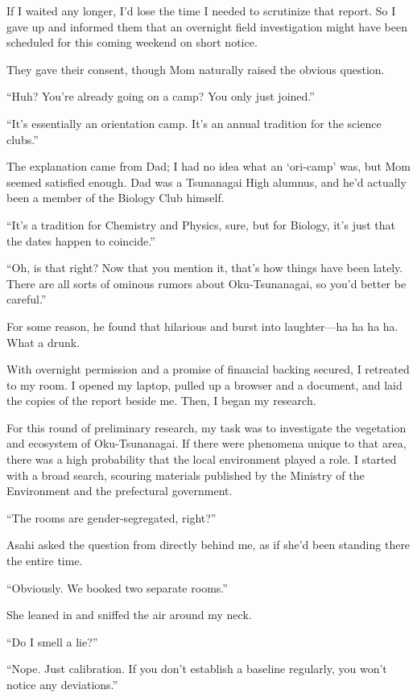 \documentclass[
    a4paper,
    12pt,
    twoside,
    openany,
    UTF8,
    fontset=windows
]{ctexbook}
\begin{document}
If I waited any longer, I'd lose the time I needed to scrutinize that report. So I gave up and informed them that an overnight field investigation might have been scheduled for this coming weekend on short notice.

They gave their consent, though Mom naturally raised the obvious question.

``Huh? You're already going on a camp? You only just joined.''

``It's essentially an orientation camp. It's an annual tradition for the science clubs.''

The explanation came from Dad; I had no idea what an `ori-camp' was, but Mom seemed satisfied enough. Dad was a Tsunanagai High alumnus, and he'd actually been a member of the Biology Club himself.

``It's a tradition for Chemistry and Physics, sure, but for Biology, it's just that the dates happen to coincide.''

``Oh, is that right? Now that you mention it, that's how things have been lately. There are all sorts of ominous rumors about Oku-Tsunanagai, so you'd better be careful.''

For some reason, he found that hilarious and burst into laughter---ha ha ha ha. What a drunk.

With overnight permission and a promise of financial backing secured, I retreated to my room. I opened my laptop, pulled up a browser and a document, and laid the copies of the report beside me. Then, I began my research.

For this round of preliminary research, my task was to investigate the vegetation and ecosystem of Oku-Tsunanagai. If there were phenomena unique to that area, there was a high probability that the local environment played a role. I started with a broad search, scouring materials published by the Ministry of the Environment and the prefectural government.

``The rooms are gender-segregated, right?''

Asahi asked the question from directly behind me, as if she'd been standing there the entire time.

``Obviously. We booked two separate rooms.''

She leaned in and sniffed the air around my neck.

``Do I smell a lie?''

``Nope. Just calibration. If you don't establish a baseline regularly, you won't notice any deviations.''
\end{document}
